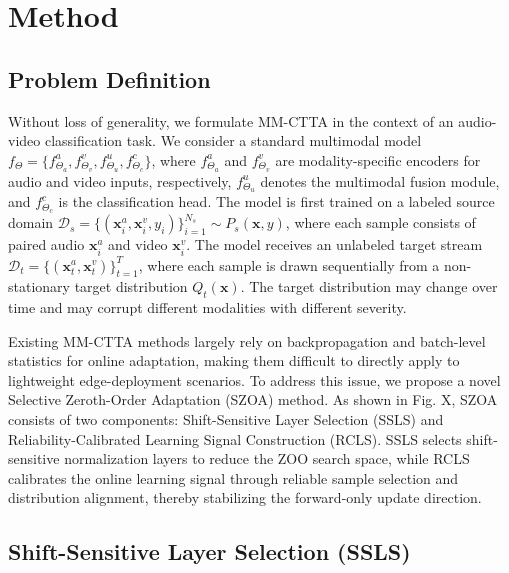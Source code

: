 \section{Method}
\subsection{Problem Definition}
\label{sec:problem}
Without loss of generality, we formulate MM-CTTA in the context of an audio-video classification task.
We consider a standard multimodal model
$f_{\Theta}=\{f^{a}_{\Theta_a}, f^{v}_{\Theta_v}, f^{u}_{\Theta_u}, f^{c}_{\Theta_c}\}$,
where $f^{a}_{\Theta_a}$ and $f^{v}_{\Theta_v}$ are modality-specific encoders for audio and video inputs, respectively, $f^{u}_{\Theta_u}$ denotes the multimodal fusion module, and $f^{c}_{\Theta_c}$ is the classification head.
The model is first trained on a labeled source domain
$\mathcal{D}_s=\{(\mathbf{x}^{a}_i,\mathbf{x}^{v}_i,y_i)\}_{i=1}^{N_s}\sim P_s(\mathbf{x},y)$,
where each sample consists of paired audio $\mathbf{x}^{a}_i$ and video $\mathbf{x}^{v}_i$.
The model receives an unlabeled target stream
$\mathcal{D}_t=\{(\mathbf{x}^{a}_t,\mathbf{x}^{v}_t)\}_{t=1}^{T}$,
where each sample is drawn sequentially from a non-stationary target distribution $Q_t(\mathbf{x})$.
The target distribution may change over time and may corrupt different modalities with different severity.

Existing MM-CTTA methods largely rely on backpropagation and batch-level statistics for online adaptation, making them difficult to directly apply to lightweight edge-deployment scenarios. To address this issue, we propose a novel Selective Zeroth-Order Adaptation (SZOA) method. As shown in Fig. X, SZOA consists of two components: Shift-Sensitive Layer Selection (SSLS) and Reliability-Calibrated Learning Signal Construction (RCLS). SSLS selects shift-sensitive normalization layers to reduce the ZOO search space, while RCLS calibrates the online learning signal through reliable sample selection and distribution alignment, thereby stabilizing the forward-only update direction.


\subsection{Shift-Sensitive Layer Selection (SSLS)}
\label{sec:layer_select}

